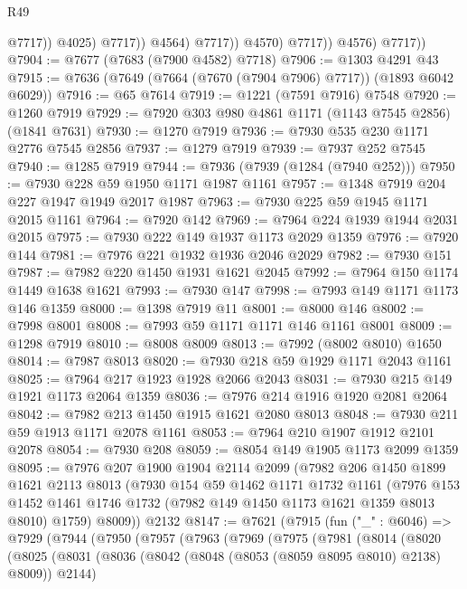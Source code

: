 \begin{lexlean}{R49}
\begin{coremodule}
                                @7717))
                            @4025)
                          @7717))
                      @4564)
                    @7717))
                @4570)
              @7717))
          @4576)
        @7717))
@7904 := @7677 (@7683 (@7900 @4582) @7718)
@7906 := @1303 @4291 @43
@7915 := @7636 (@7649 (@7664 (@7670 (@7904 @7906) @7717)) (@1893 @6042 @6029))
@7916 := @65 @7614
@7919 := @1221 (@7591 @7916) @7548
@7920 := @1260 @7919
@7929 := @7920 @303 @980 @4861 @1171 (@1143 @7545 @2856) (@1841 @7631)
@7930 := @1270 @7919
@7936 := @7930 @535 @230 @1171 @2776 @7545 @2856
@7937 := @1279 @7919
@7939 := @7937 @252 @7545
@7940 := @1285 @7919
@7944 := @7936 (@7939 (@1284 (@7940 @252)))
@7950 := @7930 @228 @59 @1950 @1171 @1987 @1161
@7957 := @1348 @7919 @204 @227 @1947 @1949 @2017 @1987
@7963 := @7930 @225 @59 @1945 @1171 @2015 @1161
@7964 := @7920 @142
@7969 := @7964 @224 @1939 @1944 @2031 @2015
@7975 := @7930 @222 @149 @1937 @1173 @2029 @1359
@7976 := @7920 @144
@7981 := @7976 @221 @1932 @1936 @2046 @2029
@7982 := @7930 @151
@7987 := @7982 @220 @1450 @1931 @1621 @2045
@7992 := @7964 @150 @1174 @1449 @1638 @1621
@7993 := @7930 @147
@7998 := @7993 @149 @1171 @1173 @146 @1359
@8000 := @1398 @7919 @11
@8001 := @8000 @146
@8002 := @7998 @8001
@8008 := @7993 @59 @1171 @1171 @146 @1161 @8001
@8009 := @1298 @7919
@8010 := @8008 @8009
@8013 := @7992 (@8002 @8010) @1650
@8014 := @7987 @8013
@8020 := @7930 @218 @59 @1929 @1171 @2043 @1161
@8025 := @7964 @217 @1923 @1928 @2066 @2043
@8031 := @7930 @215 @149 @1921 @1173 @2064 @1359
@8036 := @7976 @214 @1916 @1920 @2081 @2064
@8042 := @7982 @213 @1450 @1915 @1621 @2080 @8013
@8048 := @7930 @211 @59 @1913 @1171 @2078 @1161
@8053 := @7964 @210 @1907 @1912 @2101 @2078
@8054 := @7930 @208
@8059 := @8054 @149 @1905 @1173 @2099 @1359
@8095 := @7976
    @207
    @1900
    @1904
    @2114
    @2099
    (@7982
      @206
      @1450
      @1899
      @1621
      @2113
      @8013
      (@7930
        @154
        @59
        @1462
        @1171
        @1732
        @1161
        (@7976 @153 @1452 @1461 @1746 @1732 (@7982 @149 @1450 @1173 @1621 @1359 @8013 @8010) @1759)
        @8009))
    @2132
@8147 := @7621
    (@7915
      (fun ("_" : @6046) =>
      @7929
        (@7944
          (@7950
            (@7957
              (@7963
                (@7969
                  (@7975
                    (@7981
                      (@8014
                        (@8020
                          (@8025
                            (@8031
                              (@8036 (@8042 (@8048 (@8053 (@8059 @8095 @8010) @2138) @8009)) @2144)

\end{coremodule}
\end{lexlean}
